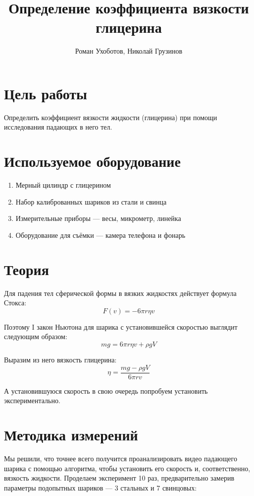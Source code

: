 \documentclass[a4paper, 12pt]{article}
\title{Определение коэффициента вязкости глицерина}
\author{Роман Ухоботов, Николай Грузинов}
\date{}%
\begin{document}
    \maketitle


    \section{Цель работы}\label{sec:target}
    Определить коэффициент вязкости жидкости (глицерина) при помощи исследования падающих в него тел.


    \section{Используемое оборудование}\label{sec:tools}
    \begin{enumerate}
        \item Мерный цилиндр с глицерином
        \item Набор калиброванных шариков из стали и свинца
        \item Измерительные приборы --- весы, микрометр, линейка
        \item Оборудование для съёмки --- камера телефона и фонарь
    \end{enumerate}


    \section{Теория}\label{sec:theory}

    Для падения тел сферической формы в вязких жидкостях действует формула Стокса:
    \[F(v) = -6 \pi r \eta v\]

    Поэтому I закон Ньютона для шарика с установившейся скоростью выглядит следующим образом:
    \[m g = 6 \pi r \eta v + \rho g V\]

    Выразим из него вязкость глицерина:
    \[ \eta = \frac{m g - \rho g V}{6 \pi r v} \]

    А установившуюся скорость в свою очередь попробуем установить экспериментально.


    \section{Методика измерений}

    Мы решили, что точнее всего получится проанализировать видео падающего шарика с помощью алгоритма,
    чтобы установить его скорость и, соответственно, вязкость жидкости.
    Проделаем эксперимент 10 раз, предварительно замерив параметры подопытных шариков --- 3 стальных и 7 свинцовых:
\end{document}
